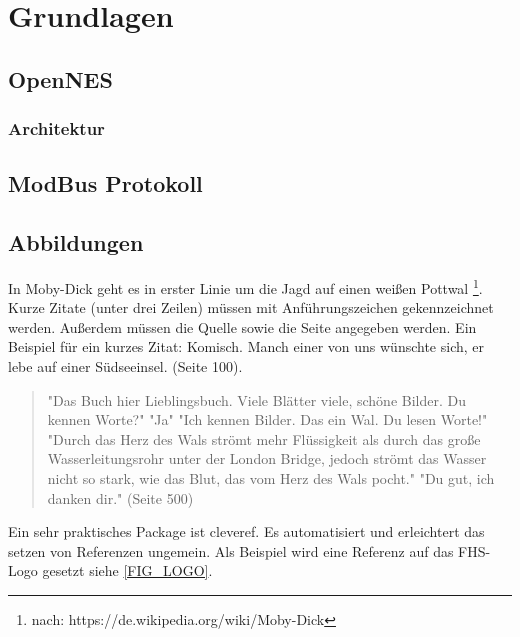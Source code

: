 \chapter{Grundlagen}

\section{OpenNES}

\subsection{Architektur}

\subsection{}

\section{ModBus Protokoll}

\section{Abbildungen}

In Moby-Dick geht es in erster Linie um die Jagd auf einen weißen Pottwal \footnote{nach: https://de.wikipedia.org/wiki/Moby-Dick}. Kurze Zitate (unter drei Zeilen) müssen mit Anführungszeichen gekennzeichnet werden. Außerdem müssen die Quelle sowie die Seite angegeben werden. Ein Beispiel für ein kurzes Zitat: \glqq Komisch. Manch einer von uns wünschte sich, er lebe auf einer Südseeinsel.\grqq \cite{MELVILLE:MOBYDICK1997} (Seite 100).

  \begin{quote}
"Das Buch hier Lieblingsbuch. Viele Blätter viele, schöne Bilder. Du kennen Worte?"\newline
"Ja"\newline
"Ich kennen Bilder. Das ein Wal. Du lesen Worte!"\newline
"Durch das Herz des Wals strömt mehr Flüssigkeit als durch das große Wasserleitungsrohr unter der London Bridge, jedoch strömt das Wasser nicht so stark, wie das Blut, das vom Herz des Wals pocht."\newline
"Du gut, ich danken dir."  \upshape \cite{MELVILLE:MOBYDICK1997} (Seite 500)
  \end{quote}

Ein sehr praktisches Package ist cleveref. Es automatisiert und erleichtert das setzen von Referenzen ungemein. Als Beispiel wird eine Referenz auf das FHS-Logo gesetzt siehe \cref{FIG_LOGO}.

